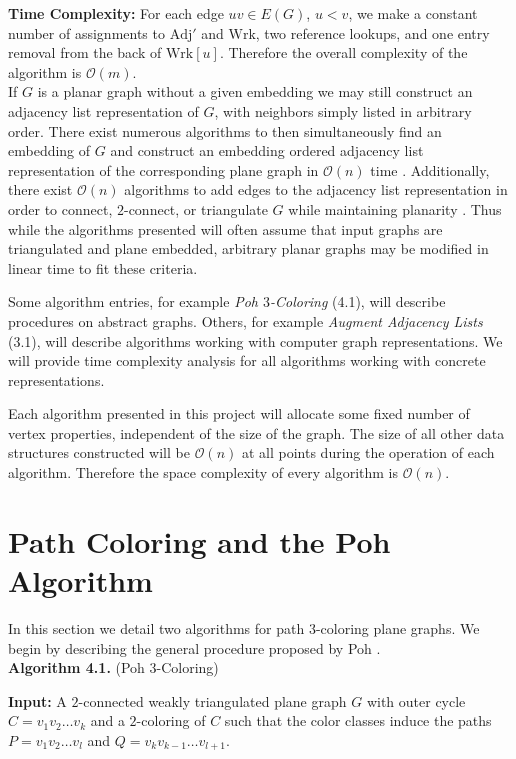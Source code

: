 \documentclass[letterpaper, 12pt]{article}
\theoremstyle{definition}
\theoremstyle{definition}
\theoremstyle{thm}
\theoremstyle{definition}
\begin{document}
\noindent\textbf{Time Complexity:} For each edge $uv\in E(G)$, $u<v$, we make a
constant number of assignments to $\text{Adj}'$ and $\text{Wrk}$, two reference
lookups, and one entry removal from the back of $\text{Wrk}[u]$.
Therefore the overall complexity of the algorithm is $\mathcal{O}(m)$.\\

If $G$ is a planar graph without a given embedding we may still construct an
adjacency list representation of $G$, with neighbors simply listed in arbitrary
order. There exist numerous algorithms to then simultaneously find an embedding
of $G$ and construct an embedding ordered adjacency list representation of the
corresponding plane graph in $\mathcal{O}(n)$ time \cite{tarjan, lempel, boyer,
booth}. Additionally, there exist $\mathcal{O}(n)$ algorithms to add edges
to the adjacency list representation in order to connect, $2$-connect, or
triangulate $G$ while maintaining planarity \cite{hagerup,reed,eswaran}.
Thus while the algorithms presented will often assume that input graphs are
triangulated and plane embedded, arbitrary planar graphs may be modified in
linear time to fit these criteria.

Some algorithm entries, for example \textit{Poh $3$-Coloring} (4.1), will
describe procedures on abstract graphs. Others, for example
\textit{Augment Adjacency Lists} (3.1), will describe algorithms
working with computer graph representations. We will provide time complexity
analysis for all algorithms working with concrete representations.

Each algorithm presented in this project will allocate some fixed number
of vertex properties, independent of the size of the graph. The size of all
other data structures constructed will be $\mathcal{O}(n)$ at all points during
the operation of each algorithm. Therefore the space complexity of every
algorithm is $\mathcal{O}(n)$.


\section{Path Coloring and the Poh Algorithm}

In this section we detail two algorithms for path $3$-coloring plane graphs. We
begin by describing the general procedure proposed by Poh \cite{poh}.\\

\noindent\textbf{Algorithm 4.1.} (Poh $3$-Coloring)

\noindent\textbf{Input:} A $2$-connected weakly triangulated plane graph $G$
with outer cycle $C=v_1v_2\ldots v_k$ and a $2$-coloring of $C$ such that the
color classes induce the paths $P=v_1v_2\ldots v_l$ and
$Q=v_{k}v_{k-1}\ldots v_{l+1}$.
\end{document}
